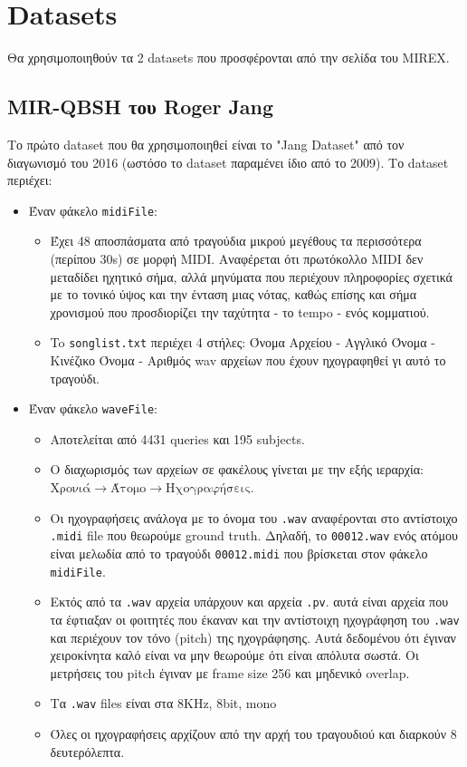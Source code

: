 \section{Datasets}

Θα χρησιμοποιηθούν τα 2 datasets που προσφέρονται από την σελίδα του MIREX\cite{mirex}.

\subsection{MIR-QBSH του Roger Jang}
Το πρώτο dataset που θα χρησιμοποιηθεί είναι το "Jang Dataset"\cite{jang-dataset} από τον διαγωνισμό του 2016 (ωστόσο το dataset παραμένει ίδιο από το 2009). Το dataset περιέχει:
\begin{itemize}
\item Έναν φάκελο \texttt{midiFile}:
\begin{itemize}
\item Έχει 48 αποσπάσματα από τραγούδια μικρού μεγέθους τα περισσότερα (περίπου 30s) σε μορφή MIDI\cite{midi1996complete}.
Αναφέρεται ότι πρωτόκολλο MIDI δεν μεταδίδει ηχητικό σήμα, αλλά μηνύματα που περιέχουν πληροφορίες σχετικά με το τονικό ύψος και την ένταση μιας νότας, καθώς επίσης και σήμα χρονισμού που προσδιορίζει την ταχύτητα - το tempo - ενός κομματιού.
\item To \texttt{songlist.txt} περιέχει 4 στήλες: Όνομα Αρχείου - Αγγλικό Όνομα - Κινέζικο Όνομα - Αριθμός wav αρχείων που έχουν ηχογραφηθεί γι αυτό το τραγούδι.
\end{itemize}

\item Έναν φάκελο \texttt{waveFile}:
\begin{itemize}
\item Αποτελείται από 4431 queries και 195 subjects.
\item Ο διαχωρισμός των αρχείων σε φακέλους γίνεται με την εξής ιεραρχία:
\(\text{Χρονιά} \rightarrow \text{Άτομο} \rightarrow \text{Ηχογραφήσεις}\).
\item Οι ηχογραφήσεις ανάλογα με το όνομα του \texttt{.wav} αναφέρονται στο αντίστοιχο \texttt{.midi} file που θεωρούμε ground truth.
Δηλαδή, το \texttt{00012.wav} ενός ατόμου είναι μελωδία από το τραγούδι \texttt{00012.midi} που βρίσκεται στον φάκελο \texttt{midiFile}.
\item Εκτός από τα \texttt{.wav} αρχεία υπάρχουν και αρχεία \texttt{.pv}.
αυτά είναι αρχεία που τα έφτιαξαν οι φοιτητές που έκαναν και την αντίστοιχη
ηχογράφηση του \texttt{.wav} και περιέχουν τον τόνο (pitch) της ηχογράφησης. Αυτά δεδομένου ότι
έγιναν χειροκίνητα καλό είναι να μην θεωρούμε ότι είναι απόλυτα σωστά. Οι μετρήσεις του
pitch έγιναν με frame size 256 και μηδενικό overlap.
\item Τα \texttt{.wav} files είναι στα 8KHz, 8bit, mono
\item Όλες οι ηχογραφήσεις αρχίζουν από την αρχή του τραγουδιού και διαρκούν 8 δευτερόλεπτα.
\end{itemize}
\end{itemize}

